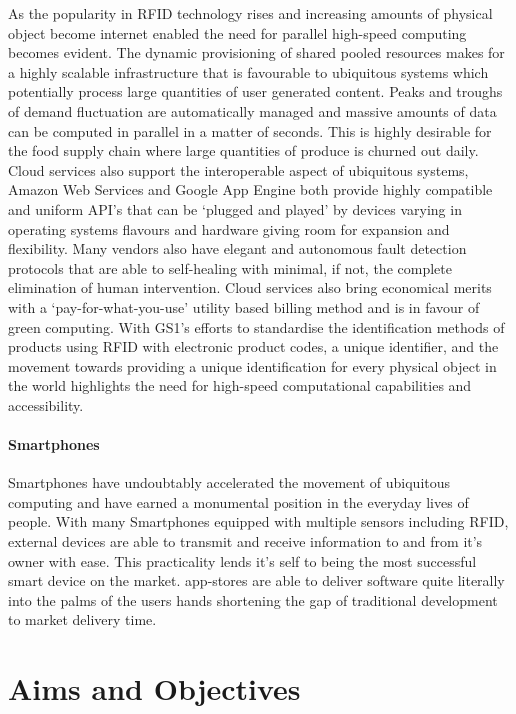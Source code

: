 \documentclass[a4paper, 11pt]{article}
\begin{document}
{As the popularity in RFID technology rises and increasing amounts of physical object become internet enabled the need for parallel high-speed computing becomes evident. The dynamic provisioning of shared pooled resources makes for a highly scalable infrastructure that is favourable to ubiquitous systems which potentially process large quantities of user generated content. Peaks and troughs of demand fluctuation are automatically managed and massive amounts of data can be computed in parallel in a matter of seconds. This is highly desirable for the food supply chain where large quantities of produce is churned out daily. Cloud services also support the interoperable aspect of ubiquitous systems, Amazon Web Services and Google App Engine both provide highly compatible and uniform API's that can be `plugged and played' by devices varying in operating systems flavours and hardware giving room for expansion and flexibility. Many vendors also have elegant and autonomous fault detection protocols that are able to self-healing with minimal, if not, the complete elimination of human intervention. Cloud services also bring economical merits with a `pay-for-what-you-use' utility based billing method and is in favour of green computing. With GS1's efforts to standardise the identification methods of products using RFID with electronic product codes, a unique identifier, and the movement towards providing a unique identification for every physical object in the world highlights the need for high-speed computational capabilities and accessibility. 

\paragraph{Smartphones}Smartphones have undoubtably accelerated the movement of ubiquitous computing and have earned a monumental position in the everyday lives of people. With many Smartphones equipped with multiple sensors including RFID, external devices are able to transmit and receive information to and from it's owner with ease. This practicality lends it's self to being the most successful smart device on the market. app-stores are able to deliver software quite literally into the palms of the users hands shortening the gap of traditional development to market delivery time. 

\clearpage

\section{Aims and Objectives}
}
\end{document}
